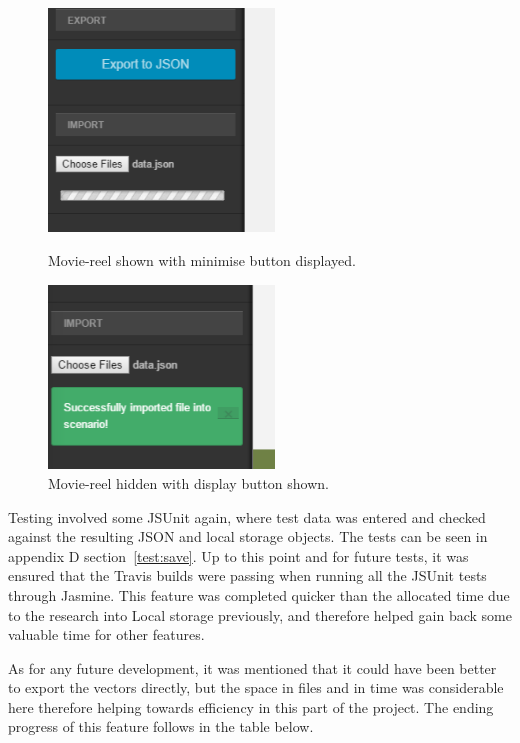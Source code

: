 \begin{figure}[h!]
	\centering
	\parbox{7cm}{
		\includegraphics[width=6cm]{images/import.png}
		\caption{Movie-reel shown with minimise button displayed.}
		\label{fig:loading}}
	\qquad
	\begin{minipage}{7cm}
		\includegraphics[width=6cm]{images/loaded.png}
		\caption{Movie-reel hidden with display button shown.}
		\label{fig:loaded}
	\end{minipage}
\end{figure}

Testing involved some JSUnit again, where test data was entered and checked against the resulting JSON and local storage objects. The tests can be seen in appendix D section~\ref{test:save}. Up to this point and for future tests, it was ensured that the Travis builds were passing when running all the JSUnit tests through Jasmine. This feature was completed quicker than the allocated time due to the research into Local storage previously, and therefore helped gain back some valuable time for other features.

As for any future development, it was mentioned that it could have been better to export the vectors directly, but the space in files and in time was considerable here therefore helping towards efficiency in this part of the project. The ending progress of this feature follows in the table below.

